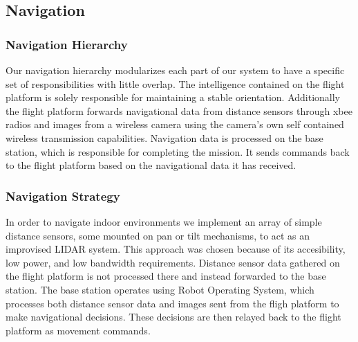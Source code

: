 \documentclass[12pt,letterpaper]{article}
\begin{document}
\subsection*{Navigation}
\subsubsection*{Navigation Hierarchy}
	Our navigation hierarchy modularizes each part of our system to have a
specific set of responsibilities with little overlap. The intelligence contained
on the flight platform is solely responsible for maintaining a stable
orientation. Additionally the flight platform forwards navigational data from
distance sensors through xbee radios and images from a wireless camera using the
camera's own self contained wireless transmission capabilities. Navigation data is processed on the base station, which is responsible
for completing the mission. It sends commands back to the flight platform based
on the navigational data it has received.

\subsubsection*{Navigation Strategy}
	In order to navigate indoor environments we implement an array of simple
distance sensors, some mounted on pan or tilt mechanisms, to act as an
improvised LIDAR system. This approach was chosen because of its accesibility,
low power, and low bandwidth requirements.
	Distance sensor data gathered on the flight platform is not processed
there and instead forwarded to the base station. The base station operates
using Robot Operating System, which processes both distance sensor data and
images sent from the fligh platform to make navigational decisions. These
decisions are then relayed back to the flight platform as movement commands.
\end{document}
